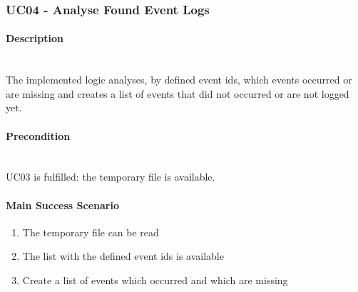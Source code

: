 \subsubsection{UC04 - Analyse Found Event Logs}\label{UC04}
\begin{tcolorbox}
    \paragraph{Description} \ \\
    The implemented logic analyses, by defined event ids, which events occurred or are missing and creates a list of events that did not occurred or are not logged yet.
    \ \\
    \paragraph{Precondition} \ \\
    UC03 is fulfilled: the temporary file is available.
    \ \\
    \paragraph{Main Success Scenario} 
    \begin{enumerate}
        \item The temporary file can be read
        \item The list with the defined event ids is available
        \item Create a list of events which occurred and which are missing
    \end{enumerate}   
\end{tcolorbox}

